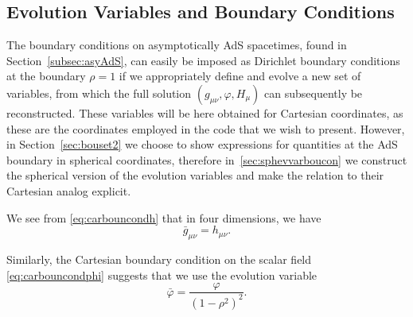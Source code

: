 \documentclass[a4paper,11pt]{article}
\numberwithin{equation}{section}
\begin{document}
\subsection{Evolution Variables and Boundary Conditions}\label{subsec:cartevvarboucon}

The boundary conditions on asymptotically AdS spacetimes, found in Section~\ref{subsec:asyAdS}, can easily be imposed as Dirichlet boundary conditions at the boundary $\rho=1$ if we appropriately define and evolve a new set of variables, from which the full solution $(g_{\mu\nu},\varphi,H_\mu)$ can subsequently be reconstructed. %
These variables will be here obtained for Cartesian coordinates, as these are the coordinates employed in the code that we wish to present. However, in Section~\ref{sec:bouset2} we choose to show expressions for quantities at the AdS boundary in spherical coordinates, therefore in~\ref{sec:sphevvarboucon} we construct the spherical version of the evolution variables and make the relation to their Cartesian analog explicit.

We see from \eqref{eq:carbouncondh} that in four dimensions, we have 
\begin{equation}\label{eq:gbarcart}
\bar{g}_{\mu\nu}=h_{\mu\nu}.
\end{equation}

Similarly, the Cartesian boundary condition on the scalar field \eqref{eq:carbouncondphi} suggests that we use the evolution variable
\begin{equation}
\label{eq:phibarcart}
\bar{\varphi}=\frac{\varphi }{(1-\rho^2)^2}.
\end{equation}
\end{document}

